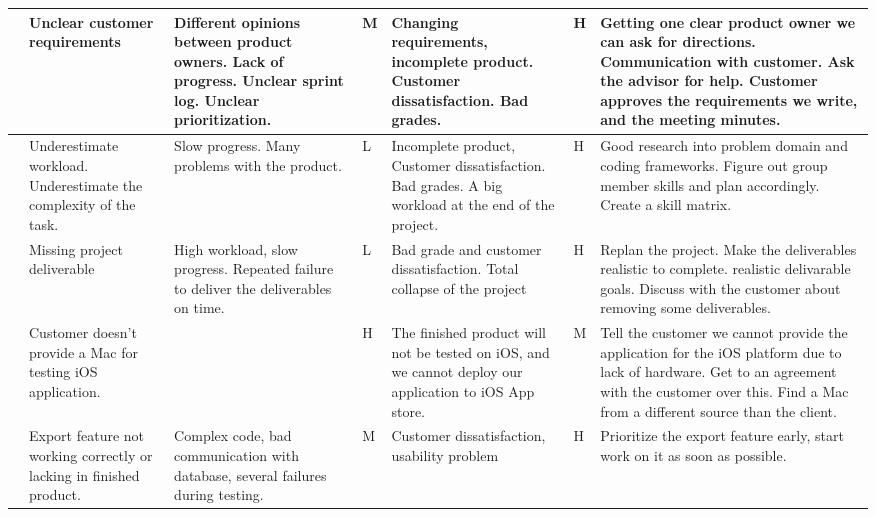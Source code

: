 \begin{landscape}
\begin{longtable}{| p{0.4cm} | p{4cm} | p{4cm} | p{2cm} | p{4cm} | p{1cm} | p{4cm} |}
	\stepcounter{riskId}
	\centering
		\arabic{riskId} &
        Unclear customer requirements &
		Different opinions between product owners. Lack of progress. Unclear sprint log. Unclear prioritization. &
		\centering  M &
		Changing requirements, incomplete product. Customer dissatisfaction. Bad grades. &
		\centering  H &
		Getting one clear product owner we can ask for directions. Communication with customer. Ask the advisor for help. Customer approves the requirements we write, and the meeting minutes. \\
	\hline

	\stepcounter{riskId}
	\centering
		\arabic{riskId} &
        Underestimate workload. Underestimate the complexity of the task. &
		Slow progress. Many problems with the product. &
		\centering  L &
		Incomplete product, Customer dissatisfaction. Bad grades. A big workload at the end of the project. &
		\centering  H &
		Good research into problem domain and coding frameworks. Figure out group member skills and plan accordingly. Create a skill matrix. \\
	\hline

	\stepcounter{riskId}
	\centering
		\arabic{riskId} &
        Missing project deliverable &
		High workload, slow progress. Repeated failure to deliver the deliverables on time. &
		\centering  L &
		Bad grade and customer dissatisfaction. Total collapse of the project &
		\centering H &
		Replan the project. Make the deliverables realistic to complete. realistic delivarable goals. Discuss with the customer about removing some deliverables. \\
	\hline

	\stepcounter{riskId}
	\centering
		\arabic{riskId} &
        Customer doesn’t provide a Mac for testing iOS application. &
		& \centering H &
		The finished product will not be tested on iOS, and we cannot deploy our application to iOS App store. &
		\centering  M &
		Tell the customer we cannot provide the application for the iOS platform due to lack of hardware. Get to an agreement with the customer over this. Find a Mac from a different source than the client. \\
	\hline

	\stepcounter{riskId}
	\centering
		\arabic{riskId} &
        Export feature not working correctly or lacking in finished product. &
		Complex code, bad communication with database, several failures during testing. &
		\centering  M &
		Customer dissatisfaction, usability problem &
		\centering H &
		Prioritize the export feature early, start work on it as soon as possible. \\
	\hline


\end{longtable}
\end{landscape}
